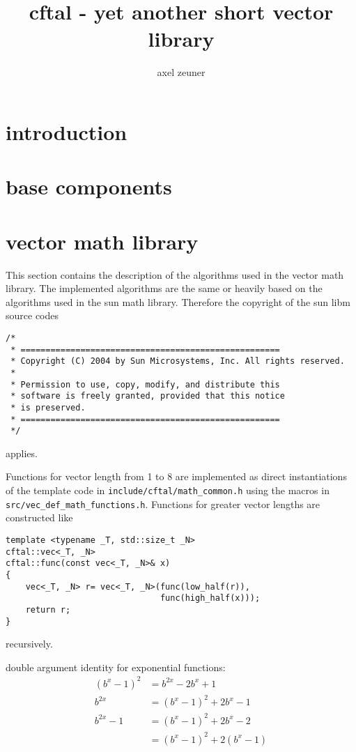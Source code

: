 \documentclass[10pt,a4paper]{article}
\numberwithin{equation}{subsection}
\begin{document}
\title{cftal - yet another short vector library}
\author{axel zeuner}
\maketitle

\tableofcontents

\section{introduction}
\label{sec:introduction}

\section{base components}
\label{sec:base}

\section{vector math library}
\label{sec:vec_math_lib}

This section contains the description of the algorithms used in the
vector math library. The implemented algorithms are the same or
heavily based on the algorithms used in the sun math
library. Therefore the copyright of the sun libm source codes

\begin{verbatim}
/*
 * ====================================================
 * Copyright (C) 2004 by Sun Microsystems, Inc. All rights reserved.
 *
 * Permission to use, copy, modify, and distribute this
 * software is freely granted, provided that this notice
 * is preserved.
 * ====================================================
 */
\end{verbatim}
applies.

Functions for vector length from 1 to 8 are implemented as direct
instantiations of the template code in \texttt{include/cftal/math\_common.h}
using the macros in \texttt{src/vec\_def\_math\_functions.h}.
Functions for greater vector lengths are constructed like
\begin{lstlisting}
template <typename _T, std::size_t _N>
cftal::vec<_T, _N>
cftal::func(const vec<_T, _N>& x)
{
    vec<_T, _N> r= vec<_T, _N>(func(low_half(r)),
                               func(high_half(x)));
    return r;
}
\end{lstlisting}
recursively.

double argument identity for exponential functions:
\[
    \begin{aligned}
        (b^x-1)^2 &= b^{2x} - 2b^x + 1 \\
        b^{2x}    &= (b^x-1)^2 + 2b^x - 1 \\
        b^{2x} -1 &= (b^x-1)^2 + 2b^x -2 \\
                  &= (b^x-1)^2 + 2(b^x-1)
    \end{aligned}
\]
\end{document}
